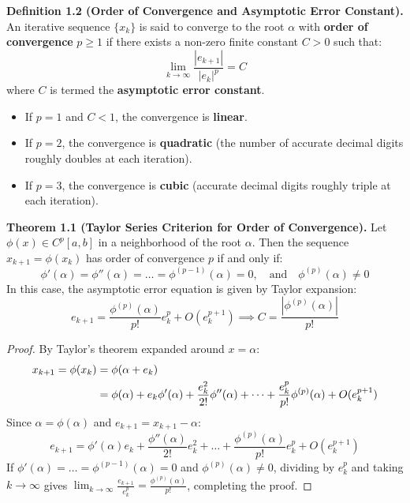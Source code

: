 \documentclass[11pt,a4paper]{article}
\numberwithin{equation}{section}
\begin{document}
\begin{defnbox}
\textbf{Definition 1.2 (Order of Convergence and Asymptotic Error Constant).}
An iterative sequence $\{x_k\}$ is said to converge to the root $\alpha$ with \textbf{order of convergence} $p \ge 1$ if there exists a non-zero finite constant $C > 0$ such that:
\begin{equation}
    \lim_{k \to \infty} \frac{|e_{k+1}|}{|e_k|^p} = C
\end{equation}
where $C$ is termed the \textbf{asymptotic error constant}.
\begin{itemize}[leftmargin=1.5em]
    \item If $p = 1$ and $C < 1$, the convergence is \textbf{linear}.
    \item If $p = 2$, the convergence is \textbf{quadratic} (the number of accurate decimal digits roughly doubles at each iteration).
    \item If $p = 3$, the convergence is \textbf{cubic} (accurate decimal digits roughly triple at each iteration).
\end{itemize}
\end{defnbox}

\begin{thmbox}
\textbf{Theorem 1.1 (Taylor Series Criterion for Order of Convergence).}
Let $\phi(x) \in C^p[a, b]$ in a neighborhood of the root $\alpha$. Then the sequence $x_{k+1} = \phi(x_k)$ has order of convergence $p$ if and only if:
\begin{equation}
    \phi'(\alpha) = \phi''(\alpha) = \dots = \phi^{(p-1)}(\alpha) = 0, \quad \text{and} \quad \phi^{(p)}(\alpha) \ne 0
\end{equation}
In this case, the asymptotic error equation is given by Taylor expansion:
\begin{equation}
    e_{k+1} = \frac{\phi^{(p)}(\alpha)}{p!} e_k^p + O(e_k^{p+1}) \implies C = \frac{|\phi^{(p)}(\alpha)|}{p!}
\end{equation}
\end{thmbox}

\begin{proof}
By Taylor's theorem expanded around $x = \alpha$:
\begin{align}
    x_{k+1} = \phi(x_k) &= \phi(\alpha + e_k) \notag \\
    &= \phi(\alpha) + e_k \phi'(\alpha) + \frac{e_k^2}{2!} \phi''(\alpha) + \dots + \frac{e_k^p}{p!} \phi^{(p)}(\alpha) + O(e_k^{p+1})
\end{align}
Since $\alpha = \phi(\alpha)$ and $e_{k+1} = x_{k+1} - \alpha$:
\begin{equation}
    e_{k+1} = \phi'(\alpha) e_k + \frac{\phi''(\alpha)}{2!} e_k^2 + \dots + \frac{\phi^{(p)}(\alpha)}{p!} e_k^p + O(e_k^{p+1})
\end{equation}
If $\phi'(\alpha) = \dots = \phi^{(p-1)}(\alpha) = 0$ and $\phi^{(p)}(\alpha) \ne 0$, dividing by $e_k^p$ and taking $k \to \infty$ gives $\lim_{k\to\infty} \frac{e_{k+1}}{e_k^p} = \frac{\phi^{(p)}(\alpha)}{p!}$, completing the proof.
\end{proof}
\end{document}
